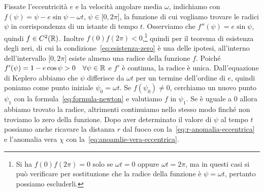 Fissate l'eccentricità $e$ e la velocità angolare media $\omega$, indichiamo con
$f(\psi) = \psi -e\sin\psi-\omega t$, $\psi\in\mathopen{[}0, 2\pi\mathclose{]}$,
la funzione di cui vogliamo trovare le radici $\psi$ in corrispondenza di un
istante di tempo $t$. Osserviamo che $f''(\psi) = e\sin\psi$, quindi
$f\in C^2(\mathbb{R})$. Inoltre $f(0)f(2\pi) <
0$,\footnote{Si
  ha $f(0)f(2\pi) = 0$ solo se $\omega t = 0$ oppure $\omega t = 2\pi$, ma in
  questi casi si può verificare per sostituzione che la radice della funzione è
  $\psi = \omega t$, pertanto possiamo escluderli.}
quindi per il teorema di esistenza degli zeri, di cui la
condizione~\eqref{eq:esistenza-zero} è una delle ipotesi, all'interno
dell'intervallo $\mathopen{[}0, 2\pi\mathclose{]}$ esiste almeno una radice
della funzione $f$. Poiché
$f'(\psi) = 1 - e\cos\psi > 0 \quad \forall \psi\in\mathbb{R}$ e $f'$ è continua, la
radice è unica. Dall'equazione di Keplero abbiamo che $\psi$ differisce da
$\omega t$ per un termine dell'ordine di $e$, quindi poniamo come punto iniziale
$\psi_0 = \omega t$. Se $f(\psi_0)\neq 0$, cerchiamo un nuovo punto $\psi_1$ con
la formula~\eqref{eq:formula-newton} e valutiamo $f$ in $\psi_1$. Se è uguale a
$0$ allora abbiamo trovato la radice, altrimenti continuiamo nello stesso modo
finché non troviamo lo zero della funzione. Dopo aver determinato il valore di
$\psi$ al tempo $t$ possiamo anche ricavare la distanza $r$ dal fuoco con
la~\eqref{eq:r-anomalia-eccentrica} e l'anomalia vera $\chi$ con
la~\eqref{eq:anoamlie-vera-eccentrica}.

